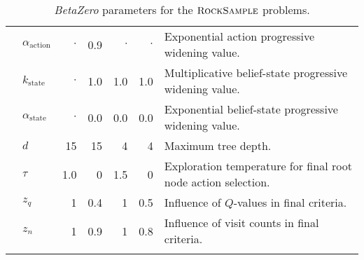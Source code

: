 \begin{table*}[hp!]
\begin{adjustbox}{max width=0.92\textwidth}
\begin{threeparttable}
\begin{footnotesize}
\begin{tabular}{@{}clrrrrm{9cm}@{}}
              & $\alpha_\text{action}$ & $\cdot$ & \num{0.9} & $\cdot$ & $\cdot$ & Exponential action progressive widening value.\\
              & $k_\text{state}$ & $\cdot$ & \num{1.0} & \num{1.0} & \num{1.0} & Multiplicative belief-state progressive widening value.\\
              & $\alpha_\text{state}$ & $\cdot$ & \num{0.0} & \num{0.0} & \num{0.0} & Exponential belief-state progressive widening value.\\
              & $d$ & \num{15} & \num{15} & \num{4} & \num{4} & Maximum tree depth. \\
              & $\tau$ & \num{1.0} & \num{0} & \num{1.5} & \num{0} & Exploration temperature for final root node action selection. \\
              & $z_q$ & \num{1} & \num{0.4} & \num{1} & \num{0.5} & Influence of $Q$-values in final criteria. \\
              & $z_n$ & \num{1} & \num{0.9} & \num{1} & \num{0.8} & Influence of visit counts in final criteria. \\
            \arrayrulecolor{black} %
            \bottomrule
        \end{tabular}
        \end{footnotesize}
    \end{threeparttable}
    \end{adjustbox}
    \caption{\textit{BetaZero} parameters for the $\textsc{RockSample}$ problems.}\label{tab:rs_params}
\end{table*}


